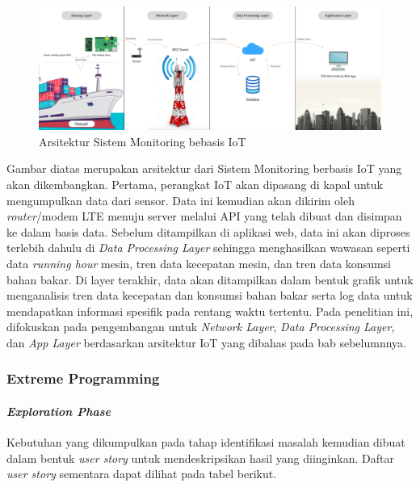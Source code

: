 \begin{figure}[!h]
    \includegraphics[width=1\linewidth, center]{images/metode/fig-system-archi.png}
    \caption{Arsitektur Sistem Monitoring bebasis IoT}
    \label{fig:system-archi}
\end{figure}

Gambar diatas merupakan arsitektur dari Sistem Monitoring berbasis IoT yang akan dikembangkan. Pertama, perangkat IoT akan dipasang di kapal untuk mengumpulkan data dari sensor. Data ini kemudian akan dikirim oleh \textit{router}/modem LTE menuju server melalui API yang telah dibuat dan disimpan ke dalam basis data. Sebelum ditampilkan di aplikasi web, data ini akan diproses terlebih dahulu di \textit{Data Processing Layer} sehingga menghasilkan wawasan seperti data \textit{running hour} mesin, tren data kecepatan mesin, dan tren data konsumsi bahan bakar. Di layer terakhir, data akan ditampilkan dalam bentuk grafik untuk menganalisis tren data kecepatan dan konsumsi bahan bakar serta log data untuk mendapatkan informasi spesifik pada rentang waktu tertentu. Pada penelitian ini, difokuskan pada pengembangan untuk \textit{Network Layer}, \textit{Data Processing Layer}, dan \textit{App Layer} berdasarkan arsitektur IoT yang dibahas pada bab sebelumnnya.

\subsubsection{Extreme Programming}

\paragraph{\textit{Exploration Phase}}

    Kebutuhan yang dikumpulkan pada tahap identifikasi masalah kemudian dibuat dalam bentuk \textit{user story} untuk mendeskripsikan hasil yang diinginkan. Daftar \textit{user story} sementara dapat dilihat pada tabel berikut.

    \newpage

